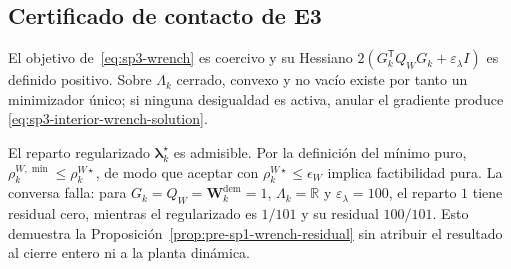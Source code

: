 \subsection{Certificado de contacto de E3}
\label{app:sp1-wrench-proofs}

El objetivo de~\eqref{eq:sp3-wrench} es coercivo y su Hessiano
$2(G_k^{\mathsf T}Q_WG_k+\varepsilon_\lambda I)$ es definido positivo. Sobre
$\Lambda_k$ cerrado, convexo y no vacío existe por tanto un minimizador único;
si ninguna desigualdad es activa, anular el gradiente produce
\eqref{eq:sp3-interior-wrench-solution}.

El reparto regularizado $\boldsymbol\lambda_k^\star$ es admisible. Por la
definición del mínimo puro,
$\rho_k^{W,\min}\leq\rho_k^{W\star}$, de modo que aceptar con
$\rho_k^{W\star}\leq\epsilon_W$ implica factibilidad pura. La conversa falla:
para $G_k=Q_W=\boldsymbol W_k^{\mathrm{dem}}=1$,
$\Lambda_k=\mathbb R$ y $\varepsilon_\lambda=100$, el reparto $1$ tiene
residual cero, mientras el regularizado es $1/101$ y su residual $100/101$.
Esto demuestra la Proposición~\ref{prop:pre-sp1-wrench-residual} sin atribuir el
resultado al cierre entero ni a la planta dinámica.
